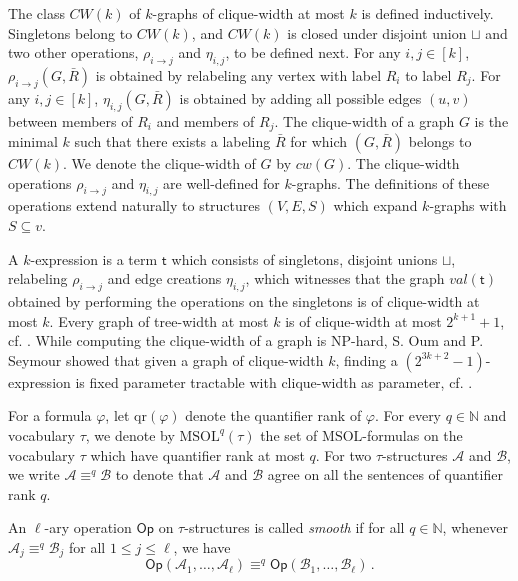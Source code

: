 \documentclass{llncs}
\newcommand{\MSOL}{\mathrm{MSOL}}
\newcommand{\NP}{\mathrm{NP}}
\newcommand{\qr}{\mathrm{qr}}
\newcommand{\N}{\mathbb{N}}
\newcommand{\Op}{\mathsf{Op}}
\begin{document}
The class $CW(k)$ of $k$-graphs of clique-width at most $k$ is defined inductively. Singletons belong to $CW(k)$, and $CW(k)$ is closed under disjoint union $\sqcup$ and 
two other operations, $\rho_{i\to j}$ and $\eta_{i,j}$, to be defined next. 
For any $i,j\in[k]$, $\rho_{i\to j}(G,\bar{R})$ is obtained by relabeling any vertex with label $R_i$ to label $R_j$. 
For any $i,j\in[k]$, $\eta_{i,j}(G,\bar{R})$ is obtained by adding all possible edges $(u,v)$ between members of $R_i$ 
and members of $R_j$. The clique-width of a graph $G$ is the minimal $k$ such that there exists a labeling $\bar{R}$ for 
which $(G,\bar{R})$ belongs to $CW(k)$. We denote the clique-width of $G$ by $cw(G)$.
The clique-width operations $\rho_{i\to j}$ and $\eta_{i,j}$ are well-defined for $k$-graphs.
The definitions of these operations extend naturally to structures $(V,E,S)$ which expand $k$-graphs with $S\subseteq v$. 

A $k$-expression is a term $\mathsf{t}$ which consists of singletons, disjoint unions $\sqcup$, relabeling $\rho_{i\to j}$ and edge creations $\eta_{i,j}$, which witnesses that the graph $val(\mathsf{t})$ obtained by performing the operations on the singletons is of clique-width at most $k$. Every graph of tree-width at most $k$ is of clique-width at most $2^{k+1}+1$, cf. \cite{ar:CourcelleOlariu2000}. While computing the clique-width of a graph is $\NP$-hard, S. Oum and P. Seymour showed that given a graph of clique-width $k$, finding a $(2^{3k+2}-1)$-expression is fixed parameter tractable with clique-width as parameter, cf. \cite{ar:Oum2005,ar:SeymourOum2006}. 

For a formula $\varphi$, let $\qr(\varphi)$ denote the quantifier
rank of $\varphi$. For every $q\in\mathbb{N}$ and vocabulary $\tau$,
we denote by $\MSOL^{q}(\tau)$ the set of $\MSOL$-formulas on the
vocabulary $\tau$ which have quantifier rank at most $q$. For two
$\tau$-structures $\mathcal{A}$ and $\mathcal{B}$, we write $\mathcal{A}\equiv^{q}\mathcal{B}$
to denote that $\mathcal{A}$ and $\mathcal{B}$ agree on all the
sentences of quantifier rank $q$. 

\begin{definition}
 An $\ell$-ary operation $\Op$ on $\tau$-structures is called {\em smooth} 
if for all $q \in \N$, 
whenever  $\mathcal{A}_j \equiv^q \mathcal{B}_j$ for all $1\leq j\leq \ell$, 
we have  $$ \Op(\mathcal{A}_1,\ldots,\mathcal{A}_\ell) \equiv^q  
\Op(\mathcal{B}_1,\ldots,\mathcal{B}_\ell)\,.$$
\end{definition}
\end{document}
